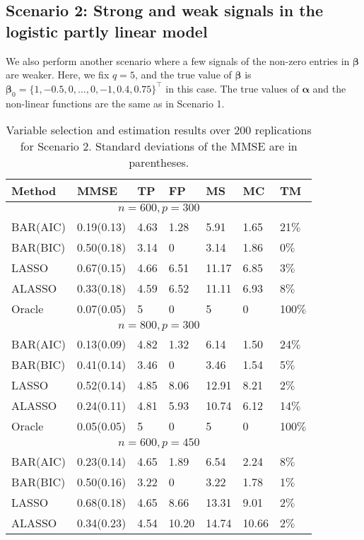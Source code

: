 \documentclass[11pt]{article}
\begin{document}
\subsection*{Scenario 2: Strong and weak signals in the logistic partly linear model}
We also perform another scenario where a few signals of the non-zero entries in $\boldsymbol{\beta}$ are weaker. Here, we fix $q=5$, and the true value of $\boldsymbol{\beta}$ is $\boldsymbol{\beta}_0= \{ 1,-0.5,0,\ldots,0,-1,0.4,0.75 \}^\top$ in this case. The true values of $\boldsymbol{\alpha}$ and the non-linear functions are the same as in Scenario 1. 
\begin{table}
\centering
\caption{Variable selection and estimation results over 200 replications for Scenario 2. Standard deviations of the MMSE are in parentheses.} \label{WS}
\begin{tabular}{l|llllll}
\hline
Method & MMSE & TP & FP & MS & MC & TM \\
\hline
\multicolumn{7}{c}{$n=600,p=300$} \\
\hline
BAR(AIC) & 0.19(0.13) & 4.63 & 1.28 & 5.91 & 1.65 & 21$\%$ \\
BAR(BIC) & 0.50(0.18) & 3.14 & 0 & 3.14 & 1.86 & 0$\%$ \\
LASSO & 0.67(0.15) & 4.66 & 6.51 & 11.17 & 6.85 & 3$\%$  \\
ALASSO & 0.33(0.18) & 4.59 & 6.52 & 11.11 & 6.93 & 8$\%$  \\
Oracle & 0.07(0.05) & 5 & 0 & 5 & 0 & 100$\%$ \\
\hline
\multicolumn{7}{c}{$n=800,p=300$} \\
\hline
BAR(AIC) & 0.13(0.09) & 4.82 & 1.32 & 6.14 & 1.50 & 24$\%$ \\
BAR(BIC) & 0.41(0.14) & 3.46 & 0 & 3.46 & 1.54 & 5$\%$ \\
LASSO & 0.52(0.14) & 4.85 & 8.06 & 12.91 & 8.21 & 2$\%$   \\
ALASSO & 0.24(0.11) & 4.81 & 5.93 & 10.74 & 6.12 & 14$\%$  \\
Oracle & 0.05(0.05) & 5 & 0 & 5 & 0 & 100$\%$ \\
\hline
\multicolumn{7}{c}{$n=600,p=450$} \\
\hline
BAR(AIC) & 0.23(0.14) & 4.65 & 1.89 & 6.54 & 2.24 & 8$\%$  \\
BAR(BIC) & 0.50(0.16) & 3.22 & 0 & 3.22 & 1.78 & 1$\%$ \\
LASSO & 0.68(0.18) & 4.65 & 8.66 & 13.31 & 9.01 & 2$\%$  \\
ALASSO & 0.34(0.23) & 4.54 & 10.20 & 14.74 & 10.66 & 2$\%$  \\

\end{tabular}
\end{table}
\end{document}
